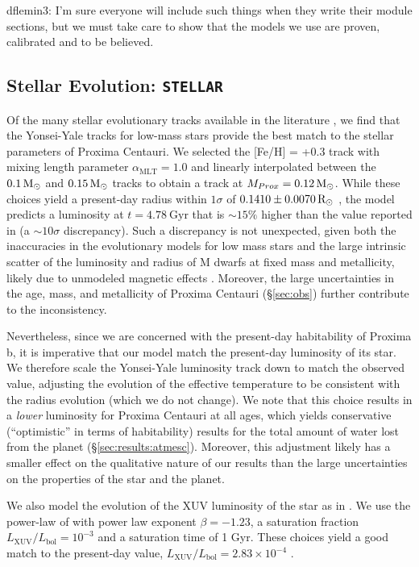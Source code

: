 \documentclass[preprint,12pt]{aastex}
\newcommand{\xxx}[1]{{\color{red} #1}} %
\def\msun{{\rm\,M_\odot}}
\def\rsun{{\rm\,R_\odot}}
\def\eg{{\it e.g.\ }}
\def\stellar{\texttt{\footnotesize{STELLAR}}\xspace}
\begin{document}
\xxx{dflemin3: I'm sure everyone will include such things when they write their module sections, but we must take
care to show that the models we use are proven, calibrated and to be believed.}

\subsection{Stellar Evolution: \stellar}
\label{sec:models:stellar}

Of the many stellar evolutionary tracks available in the literature
\citep[\eg][]{Baraffe98,Dartmouth08,Baraffe15}, we find that the
Yonsei-Yale tracks for low-mass stars \citep{YonseiYale13} provide the
best match to the stellar parameters of Proxima Centauri. We selected
the [Fe/H] = +0.3 track with mixing length parameter
$\alpha_\mathrm{MLT} = 1.0$ and linearly interpolated between the $0.1
\msun$ and $0.15 \msun$ tracks to obtain a track at $M_{Prox} = 0.12
\msun$.  While these choices yield a present-day radius within
$1\sigma$ of $0.1410 \pm 0.0070 \rsun$ \citep{Boyajian12}, the model
predicts a luminosity at $t = 4.78\ \mathrm{Gyr}$ that is $\sim 15\%$
higher than the value reported in \cite{Boyajian12} (a $\sim 10\sigma$
discrepancy). Such a discrepancy is not unexpected, given both the
inaccuracies in the evolutionary models for low mass stars and the
large intrinsic scatter of the luminosity and radius of M dwarfs at
fixed mass and metallicity, likely due to unmodeled magnetic effects
\citep{YonseiYale13}. Moreover, the large uncertainties in the age,
mass, and metallicity of Proxima Centauri (\S\ref{sec:obs}) further
contribute to the inconsistency.

Nevertheless, since we are concerned with the present-day habitability
of Proxima b, it is imperative that our model match the present-day
luminosity of its star. We therefore scale the Yonsei-Yale luminosity
track down to match the observed value, adjusting the evolution of the
effective temperature to be consistent with the radius evolution
(which we do not change). We note that this choice results in a
\emph{lower} luminosity for Proxima Centauri at all ages, which yields
conservative (``optimistic'' \xxx{in terms of habitability}) results for the total amount of water
lost from the planet (\S\ref{sec:results:atmesc}). Moreover, this
adjustment likely has a smaller effect on the qualitative nature of
our results than the large uncertainties on the properties of the star
and the planet.

We also model the evolution of the XUV luminosity of the star as in
\cite{LugerBarnes15}. We use the power-law of \cite{Ribas05} with
power law exponent $\beta = -1.23$, a saturation fraction
$L_\mathrm{XUV}/L_\mathrm{bol} = 10^{-3}$ and a saturation time of 1
Gyr. These choices yield a good match to the present-day value,
$L_\mathrm{XUV}/L_\mathrm{bol} = 2.83\times 10^{-4}$
\citep{Boyajian12}.
\end{document}
